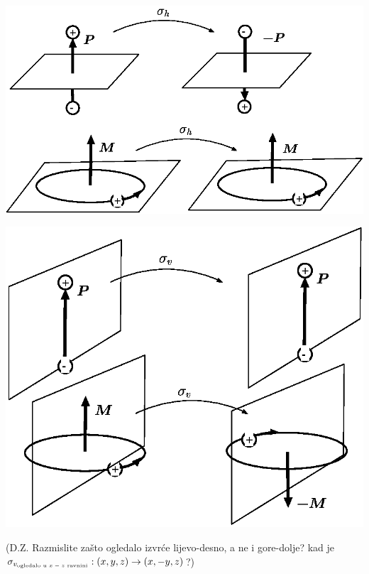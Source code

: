 \centerline{\includegraphics[scale=0.8]{pics/aksijal1.eps}}

\centerline{\includegraphics[scale=0.8]{pics/aksijal2.eps}}

(D.Z. Razmislite zašto ogledalo izvrće lijevo-desno, a ne i gore-dolje? kad je
$\sigma_{v_{\mbox{\tiny ogledalo u $x-z$ ravnini}}}:(x, y, z)\to (x, -y, z)$?)

